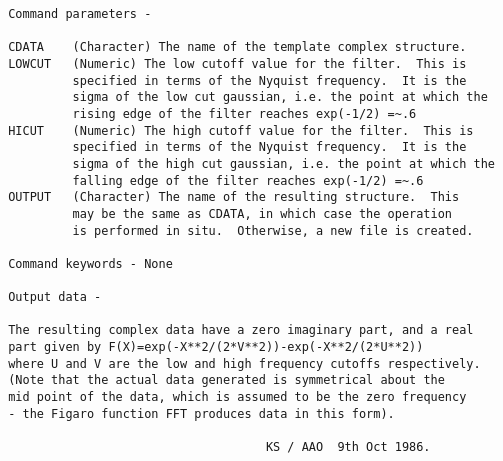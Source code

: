 \begin{description}
\begin{verbatim}
 Command parameters -

 CDATA    (Character) The name of the template complex structure.
 LOWCUT   (Numeric) The low cutoff value for the filter.  This is
          specified in terms of the Nyquist frequency.  It is the
          sigma of the low cut gaussian, i.e. the point at which the
          rising edge of the filter reaches exp(-1/2) =~.6
 HICUT    (Numeric) The high cutoff value for the filter.  This is
          specified in terms of the Nyquist frequency.  It is the
          sigma of the high cut gaussian, i.e. the point at which the
          falling edge of the filter reaches exp(-1/2) =~.6
 OUTPUT   (Character) The name of the resulting structure.  This
          may be the same as CDATA, in which case the operation
          is performed in situ.  Otherwise, a new file is created.

 Command keywords - None

 Output data -

 The resulting complex data have a zero imaginary part, and a real
 part given by F(X)=exp(-X**2/(2*V**2))-exp(-X**2/(2*U**2))
 where U and V are the low and high frequency cutoffs respectively.
 (Note that the actual data generated is symmetrical about the
 mid point of the data, which is assumed to be the zero frequency
 - the Figaro function FFT produces data in this form).

                                     KS / AAO  9th Oct 1986.
\end{verbatim}
\end{description}
